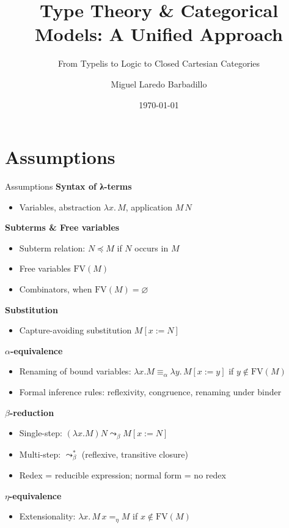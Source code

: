 \documentclass[aspectratio=169]{beamer}
\title{Type Theory \& Categorical Models: A Unified Approach}
\subtitle{From Typelis to Logic to Closed Cartesian Categories}
\date{\today}
\author{Miguel Laredo Barbadillo}
\institute{Master's in Formal Methods in Computer Science}
\newcommand{\curly}{\mathrel{\leadsto}_\beta}
\begin{document}
\maketitle

\section{Assumptions}

\begin{frame}{Assumptions}
  \textbf{Syntax of λ-terms}
  \begin{itemize}
  \item Variables, abstraction $\lambda x.\,M$, application $M\,N$
  \end{itemize}
  
  \textbf{Subterms \& Free variables}
  \begin{itemize}
  \item Subterm relation: $N \preceq M$ if $N$ occurs in $M$
  \item Free variables $\mathrm{FV}(M)$
  \item Combinators, when $\mathrm{FV}(M)=\varnothing$
  \end{itemize}
  
  \textbf{Substitution}
  \begin{itemize}
  \item Capture-avoiding substitution $M[x:=N]$
  \end{itemize}
\end{frame}


\begin{frame}
  \textbf{$\alpha$-equivalence}
  \begin{itemize}
  \item Renaming of bound variables: $\lambda x.M \equiv_\alpha \lambda y.\,M[x:=y]$ if $y\notin\mathrm{FV}(M)$
  \item Formal inference rules: reflexivity, congruence, renaming under binder
  \end{itemize}

  \textbf{$\beta$-reduction}
  \begin{itemize}
  \item Single-step: $(\lambda x.M) N \curly M[x:=N]$
  \item Multi-step: $\curly^{*}$ (reflexive, transitive closure)
  \item Redex = reducible expression; normal form = no redex
  \end{itemize}

  \textbf{$\eta$-equivalence}
  \begin{itemize}
  \item Extensionality: $\lambda x.\,M\,x =_\eta M$ if $x\notin\mathrm{FV}(M)$
  \end{itemize}
\end{frame}
\end{document}
